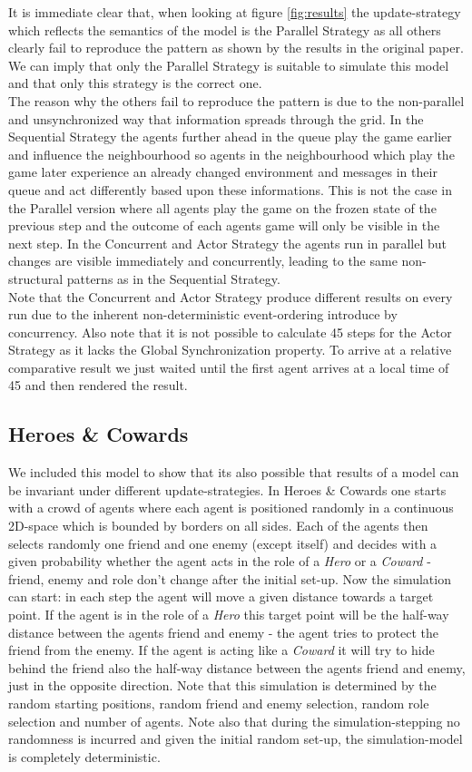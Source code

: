 It is immediate clear that, when looking at figure \ref{fig:results} the update-strategy which reflects the semantics of the model is the Parallel Strategy as all others clearly fail to reproduce the pattern as shown by the results in the original paper. We can imply that only the Parallel Strategy is suitable to simulate this model and that only this strategy is the correct one. \\
The reason why the others fail to reproduce the pattern is due to the non-parallel and unsynchronized way that information spreads through the grid. In the Sequential Strategy the agents further ahead in the queue play the game earlier and influence the neighbourhood so agents in the neighbourhood which play the game later experience an already changed environment and  messages in their queue and act differently based upon these informations. This is not the case in the Parallel version where all agents play the game on the frozen state of the previous step and the outcome of each agents game will only be visible in the next step. In the Concurrent and Actor Strategy the agents run in parallel but changes are visible immediately and concurrently, leading to the same non-structural patterns as in the Sequential Strategy. \\
Note that the Concurrent and Actor Strategy produce different results on every run due to the inherent non-deterministic event-ordering introduce by concurrency. Also note that it is not possible to calculate 45 steps for the Actor Strategy as it lacks the Global Synchronization property. To arrive at a relative comparative result we just waited until the first agent arrives at a local time of 45 and then rendered the result. 

\subsection{Heroes \& Cowards}
We included this model to show that its also possible that results of a model can be invariant under different update-strategies. In Heroes \& Cowards one starts with a crowd of agents where each agent is positioned randomly in a continuous 2D-space which is bounded by borders on all sides. Each of the agents then selects randomly one friend and one enemy (except itself) and decides with a given probability whether the agent acts in the role of a \textit{Hero} or a \textit{Coward} - friend, enemy and role don't change after the initial set-up. Now the simulation can start: in each step the agent will move a given distance towards a target point. If the agent is in the role of a \textit{Hero} this target point will be the half-way distance between the agents friend and enemy - the agent tries to protect the friend from the enemy. If the agent is acting like a \textit{Coward} it will try to hide behind the friend also the half-way distance between the agents friend and enemy, just in the opposite direction. Note that this simulation is determined by the random starting positions, random friend and enemy selection, random role selection and number of agents. Note also that during the simulation-stepping no randomness is incurred and given the initial random set-up, the simulation-model is completely deterministic. \\

